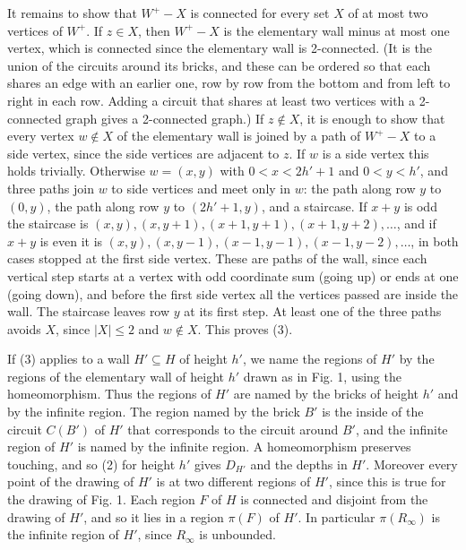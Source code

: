 {It remains to show that $W^+ - X$ is connected for every set $X$ of at most two vertices of $W^+$. If $z \in X$, then $W^+ - X$ is the elementary wall minus at most one vertex, which is connected since the elementary wall is 2-connected. (It is the union of the circuits around its bricks, and these can be ordered so that each shares an edge with an earlier one, row by row from the bottom and from left to right in each row. Adding a circuit that shares at least two vertices with a 2-connected graph gives a 2-connected graph.) If $z \notin X$, it is enough to show that every vertex $w \notin X$ of the elementary wall is joined by a path of $W^+ - X$ to a side vertex, since the side vertices are adjacent to $z$. If $w$ is a side vertex this holds trivially. Otherwise $w = (x, y)$ with $0 < x < 2h' + 1$ and $0 < y < h'$, and three paths join $w$ to side vertices and meet only in $w$: the path along row $y$ to $(0, y)$, the path along row $y$ to $(2h' + 1, y)$, and a staircase. If $x + y$ is odd the staircase is $(x, y), (x, y + 1), (x + 1, y + 1), (x + 1, y + 2), \dots$, and if $x + y$ is even it is $(x, y), (x, y - 1), (x - 1, y - 1), (x - 1, y - 2), \dots$, in both cases stopped at the first side vertex. These are paths of the wall, since each vertical step starts at a vertex with odd coordinate sum (going up) or ends at one (going down), and before the first side vertex all the vertices passed are inside the wall. The staircase leaves row $y$ at its first step. At least one of the three paths avoids $X$, since $|X| \le 2$ and $w \notin X$. This proves (3).

If (3) applies to a wall $H' \subseteq H$ of height $h'$, we name the regions of $H'$ by the regions of the elementary wall of height $h'$ drawn as in Fig. 1, using the homeomorphism. Thus the regions of $H'$ are named by the bricks of height $h'$ and by the infinite region. The region named by the brick $B'$ is the inside of the circuit $C(B')$ of $H'$ that corresponds to the circuit around $B'$, and the infinite region of $H'$ is named by the infinite region. A homeomorphism preserves touching, and so (2) for height $h'$ gives $D_{H'}$ and the depths in $H'$. Moreover every point of the drawing of $H'$ is at two different regions of $H'$, since this is true for the drawing of Fig. 1. Each region $F$ of $H$ is connected and disjoint from the drawing of $H'$, and so it lies in a region $\pi(F)$ of $H'$. In particular $\pi(R_\infty)$ is the infinite region of $H'$, since $R_\infty$ is unbounded.

}
